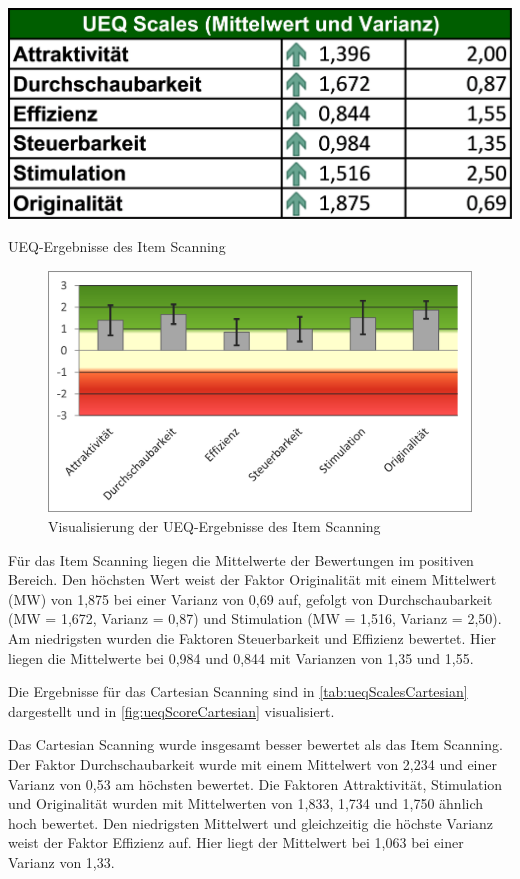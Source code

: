 \begin{table}[tbh]
    \centering
    \includegraphics{images/Results/UEQ-Table-Means-Item.png}
    \caption{UEQ-Ergebnisse des Item Scanning}
    \label{tab:ueqScalesItem}
\end{table}

\begin{figure}[tbh]
    \centering
    \includegraphics{images/Results/UEQ-Item.png}
    \caption{Visualisierung der UEQ-Ergebnisse des Item Scanning}
    \label{fig:ueqScoreItem}
\end{figure}

Für das Item Scanning liegen die Mittelwerte der Bewertungen im positiven Bereich. Den höchsten Wert weist der Faktor Originalität mit einem Mittelwert (MW) von 1,875 bei einer Varianz von 0,69 auf, gefolgt von Durchschaubarkeit (MW = 1,672, Varianz = 0,87) und Stimulation (MW = 1,516, Varianz = 2,50). Am niedrigsten wurden die Faktoren Steuerbarkeit und Effizienz bewertet. Hier liegen die Mittelwerte bei 0,984 und 0,844 mit Varianzen von 1,35 und 1,55. 

Die Ergebnisse für das Cartesian Scanning sind in \autoref{tab:ueqScalesCartesian} dargestellt und in \autoref{fig:ueqScoreCartesian} visualisiert. 

Das Cartesian Scanning wurde insgesamt besser bewertet als das Item Scanning. Der Faktor Durchschaubarkeit wurde mit einem Mittelwert von 2,234 und einer Varianz von 0,53 am höchsten bewertet. Die Faktoren Attraktivität, Stimulation und Originalität wurden mit Mittelwerten von 1,833, 1,734 und 1,750 ähnlich hoch bewertet. Den niedrigsten Mittelwert und gleichzeitig die höchste Varianz weist der Faktor Effizienz auf. Hier liegt der Mittelwert bei 1,063 bei einer Varianz von 1,33. 

